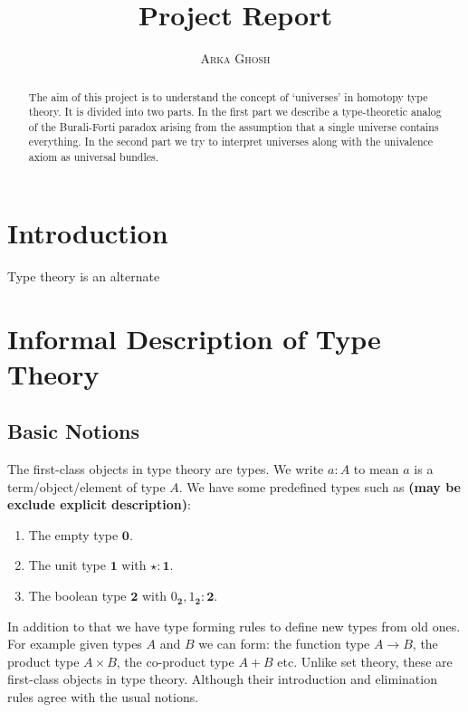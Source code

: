 \documentclass[10pt]{article}
\title{\bf{Project Report}}
\author{\textsc{Arka Ghosh}}
\theoremstyle{definition}
\theoremstyle{plain}
\theoremstyle{remark}
\begin{document}
\begin{titlepage}

\maketitle

\tableofcontents

\begin{abstract}
The aim of this project is to understand the concept of `universes' in homotopy type theory.
It is divided into two parts. In the first part we describe a type-theoretic analog of the
Burali-Forti paradox arising from the assumption that a single universe contains everything.
In the second part we try to interpret universes along with the univalence axiom as 
universal bundles.
\end{abstract}

\end{titlepage}


\section{Introduction}\label{Intro}
Type theory is an alternate

\section{Informal Description of Type Theory}

\subsection{Basic Notions}

The first-class objects in type theory are types.  We write $a : A$ to mean $a$ is a 
term/object/element of type $A$. We have some predefined types such as \textbf{(may be exclude
explicit description)}:
\begin{enumerate}
\item The empty type $\mathbf{0}$.
\item The unit type $\mathbf{1}$ with $\star : \mathbf{1}$.
\item The boolean type $\mathbf{2}$ with $0_{\mathbf{2}}, 1_{\mathbf{2}} : \mathbf{2}$.  
\end{enumerate}
In addition to that we have type forming rules to define new types from old ones. For example
given types $A$ and $B$ we can form: the function type $A \to B$, the product type 
$A \times B$, the co-product type $A + B$ etc. Unlike set theory, these are first-class 
objects in type theory. Although their introduction and elimination rules agree with the 
usual notions.\smallskip
\end{document}
